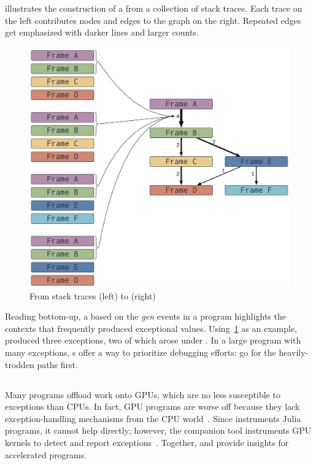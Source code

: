 \documentclass{juliacon}
\begin{document}
 illustrates the construction of a \CSTG{} from a collection of stack traces.
Each trace on the left contributes nodes and edges to the graph on the right.
Repeated edges get emphasized with darker lines and larger counts.

\begin{figure}[t]
  \centering
  \includegraphics[width=0.9\columnwidth]{./fig/cstg_static_diagram.pdf}
  \caption{From stack traces (left) to \CSTG{} (right)}
  \label{fig:cstg_demo}
\end{figure}

Reading bottom-up, a \CSTG{} based on the \emph{gen} events in a program
highlights the contexts that frequently produced exceptional values.
Using~\cref{fig:cstg_demo} as an example,  produced
three exceptions, two of which arose under .
In a large program with many exceptions, \CSTG{}s offer a way to prioritize
debugging efforts: go for the heavily-trodden paths first.


\subsection{\GPUFPX{}}
\label{s:gpufpx}

Many programs offload work onto GPUs, which are no less susceptible to \fp{} exceptions than CPUs.
In fact, GPU programs are worse off because they lack exception-handling mechanisms from the CPU world~\cite{llg-soap-2022}.
Since \FT{} instruments Julia programs, it cannot help directly;
however, the companion tool \GPUFPX{} instruments GPU kernels to detect and report
\fp{} exceptions~\cite{llsflg-hpdc-2023}.
Together, \FT{} and \GPUFPX{} provide insights for accelerated programs.
\end{document}
